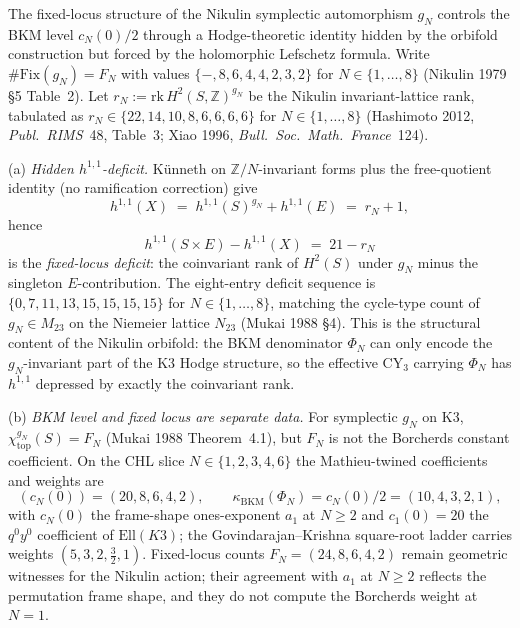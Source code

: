 \begin{remark}
\label{rem:cy-c-beyond-k3e-nikulin-fixed-locus-bkm-level}
The fixed-locus structure of the Nikulin symplectic automorphism
$g_N$ controls the BKM level $c_N(0)/2$ through a Hodge-theoretic
identity hidden by the orbifold construction but forced by the
holomorphic Lefschetz formula. Write
$\#\mathrm{Fix}(g_N) = F_N$ with values
$\{-,8,6,4,4,2,3,2\}$ for $N\in\{1,\ldots,8\}$ (Nikulin 1979 \S 5
Table~2). Let $r_N := \mathrm{rk}\,H^2(S,\mathbb Z)^{g_N}$ be the
Nikulin invariant-lattice rank, tabulated as
$r_N\in\{22,14,10,8,6,6,6,6\}$ for $N\in\{1,\ldots,8\}$
(Hashimoto 2012, \emph{Publ.\ RIMS}~48, Table~3; Xiao 1996,
\emph{Bull.\ Soc.\ Math.\ France}~124).

\textup{(a)} \emph{Hidden $h^{1,1}$-deficit.}
K\"unneth on $\mathbb Z/N$-invariant forms plus the free-quotient
identity (no ramification correction) give
\[
 h^{1,1}(X)
 \;=\; h^{1,1}(S)^{g_N} + h^{1,1}(E)
 \;=\; r_N + 1,
\]
hence
\[
 h^{1,1}(S\times E) - h^{1,1}(X) \;=\; 21 - r_N
\]
is the \emph{fixed-locus deficit}: the coinvariant rank of $H^2(S)$
under $g_N$ minus the singleton $E$-contribution. The eight-entry
deficit sequence is
$\{0, 7, 11, 13, 15, 15, 15, 15\}$
for $N\in\{1,\ldots,8\}$, matching the cycle-type count of
$g_N\in M_{23}$ on the Niemeier lattice $N_{23}$ (Mukai 1988 \S 4).
This is the structural content of the Nikulin orbifold: the BKM
denominator $\Phi_N$ can only encode the $g_N$-invariant part of
the K3 Hodge structure, so the effective CY$_3$ carrying $\Phi_N$
has $h^{1,1}$ depressed by exactly the coinvariant rank.

\textup{(b)} \emph{BKM level and fixed locus are separate data.}
For symplectic $g_N$ on K3,
$\chi_{\mathrm{top}}^{g_N}(S) = F_N$ (Mukai 1988 Theorem~4.1), but
$F_N$ is not the Borcherds constant coefficient.  On the CHL slice
$N\in\{1,2,3,4,6\}$ the Mathieu-twined coefficients and weights are
\[
 (c_N(0))=(20,8,6,4,2),\qquad
 \kappa_{\mathrm{BKM}}(\Phi_N)=c_N(0)/2=(10,4,3,2,1),
\]
with $c_N(0)$ the frame-shape ones-exponent $a_1$ at $N \geq 2$ and
$c_1(0) = 20$ the $q^0y^0$ coefficient of $\mathrm{Ell}(K3)$; the
Govindarajan--Krishna square-root ladder carries weights
$(5, 3, 2, \tfrac32, 1)$. Fixed-locus counts
$F_N=(24,8,6,4,2)$ remain geometric witnesses for the Nikulin action;
their agreement with $a_1$ at $N \geq 2$ reflects the permutation
frame shape, and they do not compute the Borcherds weight at $N = 1$.


\end{remark}
